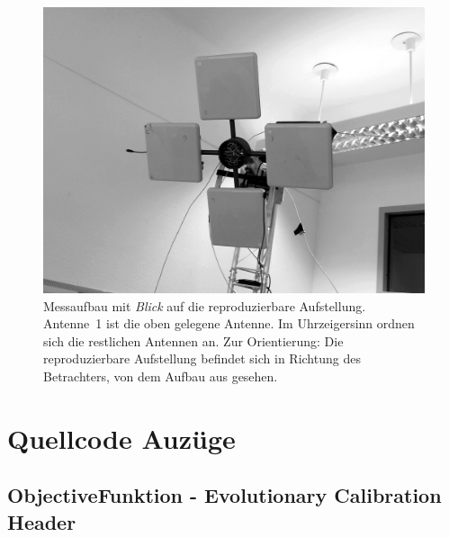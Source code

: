 \begin{appendix}
\begin{figure}[h!]
         \label{fig:Spider1}
\end{figure}
\newpage
%
\begin{figure}[h!]
 \centering
         \includegraphics[width=\textwidth]{img/4AntennaSetup.png}
         \caption[Übersicht Kalibrieraufbau]{Messaufbau mit \textit{Blick} auf die reproduzierbare Aufstellung. Antenne~1 ist die oben gelegene Antenne. Im Uhrzeigersinn ordnen sich die restlichen Antennen an. Zur Orientierung: Die reproduzierbare Aufstellung befindet sich in Richtung des Betrachters, von dem Aufbau aus gesehen.}
         \label{fig:Spider_setup1}
\end{figure}
\newpage
%
\chapter{Quellcode Auzüge}
\section{ObjectiveFunktion - Evolutionary Calibration Header}

\lstset{
	basicstyle=\scriptsize,
	language=C++,
	numbers=left,
	breaklines=true,
	frame=tbrl,
	breakatwhitespace=false
	breaklines=true,  
	xleftmargin=1cm,
	tabsize=2,
	showstringspaces=false}


\end{appendix}
